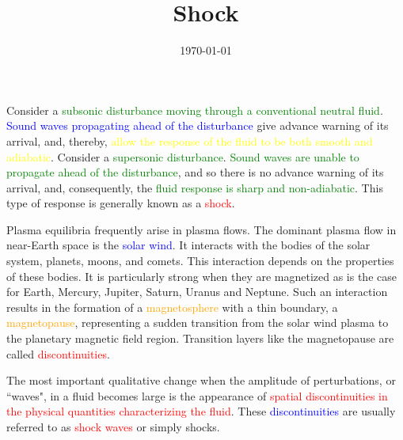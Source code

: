 \documentclass[12pt,a4paper]{article}
\title{Shock}
\author{}
\date{\today}
\begin{document}
\maketitle

\cite{Plasma2014} Consider a \textcolor{green}{subsonic disturbance moving through a conventional neutral fluid}. \textcolor{blue}{Sound waves propagating ahead of the disturbance} give advance warning of its arrival, and, thereby, \textcolor{yellow}{allow the response of the fluid to be both smooth and adiabatic}. Consider a \textcolor{green}{supersonic disturbance}. \textcolor{green}{Sound waves are unable to propagate ahead of the disturbance}, and so there is no advance warning of its arrival, and, consequently, the \textcolor{green}{fluid response is sharp and non-adiabatic}. This type of response is generally known as a \textcolor{red}{shock}.


\cite{1996bspp.book.....B} Plasma equilibria frequently arise in plasma flows. The dominant plasma flow in near-Earth space is the \textcolor{blue}{solar wind}. It interacts with the bodies of the solar system, planets, moons, and comets. This interaction depends on the properties of these bodies. It is particularly strong when they are magnetized as is the case for Earth, Mercury, Jupiter, Saturn, Uranus and Neptune. Such an interaction results in the formation of a \textcolor{orange}{magnetosphere} with a thin boundary, a \textcolor{orange}{magnetopause}, representing a sudden transition from the solar wind plasma to the planetary magnetic field region. Transition layers like the magnetopause are called \textcolor{red}{discontinuities}.





\cite{2015bps..book.....C} The most important qualitative change when the amplitude of perturbations, or ``waves", in a fluid becomes large is the appearance of \textcolor{red}{spatial discontinuities in the physical quantities characterizing the fluid}. These \textcolor{blue}{discontinuities} are usually referred to as \textcolor{red}{shock waves} or simply shocks.
\end{document}
